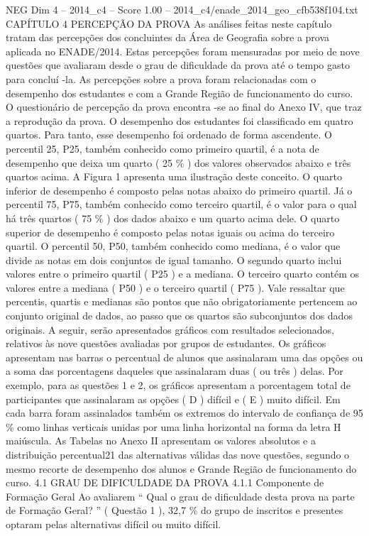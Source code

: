 \begin{textsample}{NEG Dim 4 – 2014\_c4 – Score 1.00 – 2014\_c4/enade\_2014\_geo\_cfb538f104.txt}  \label{ex:f4_neg_153}
CAPÍTULO 4 PERCEPÇÃO DA PROVA As análises feitas neste capítulo tratam das percepções dos concluintes da Área de Geografia sobre a prova aplicada no ENADE/2014.
Estas percepções foram mensuradas por meio de nove questões que avaliaram desde o grau de dificuldade da prova até o tempo gasto para concluí -la.
As percepções sobre a prova foram relacionadas com o desempenho dos estudantes e com a Grande Região de funcionamento do curso.
O questionário de percepção da prova encontra -se ao final do Anexo IV, que traz a reprodução da prova.
O desempenho dos estudantes foi classificado em quatro quartos.
Para tanto, esse desempenho foi ordenado de forma ascendente.
O percentil 25, P25, também conhecido como primeiro quartil, é a nota de desempenho que deixa um quarto ( 25 \% ) dos valores observados abaixo e três quartos acima.
A Figura 1 apresenta uma ilustração deste conceito.
O quarto inferior de desempenho é composto pelas notas abaixo do primeiro quartil.
Já o percentil 75, P75, também conhecido como terceiro quartil, é o valor para o qual há três quartos ( 75 \% ) dos dados abaixo e um quarto acima dele.
O quarto superior de desempenho é composto pelas notas iguais ou acima do terceiro quartil.
O percentil 50, P50, também conhecido como mediana, é o valor que divide as notas em dois conjuntos de igual tamanho.
O segundo quarto inclui valores entre o primeiro quartil ( P25 ) e a mediana.
O terceiro quarto contém os valores entre a mediana ( P50 ) e o terceiro quartil ( P75 ).
Vale ressaltar que percentis, quartis e medianas são pontos que não obrigatoriamente pertencem ao conjunto original de dados, ao passo que os quartos são subconjuntos dos dados originais.
A seguir, serão apresentados gráficos com resultados selecionados, relativos às nove questões avaliadas por grupos de estudantes.
Os gráficos apresentam nas barras o percentual de alunos que assinalaram uma das opções ou a soma das porcentagens daqueles que assinalaram duas ( ou três ) delas.
Por exemplo, para as questões 1 e 2, os gráficos apresentam a porcentagem total de participantes que assinalaram as opções ( D ) difícil e ( E ) muito difícil.
Em cada barra foram assinalados também os extremos do intervalo de confiança de 95 \% como linhas verticais unidas por uma linha horizontal na forma da letra H maiúscula.
As Tabelas no Anexo II apresentam os valores absolutos e a distribuição percentual21 das alternativas válidas das nove questões, segundo o mesmo recorte de desempenho dos alunos e Grande Região de funcionamento do curso. 4.1 GRAU DE DIFICULDADE DA PROVA 4.1.1 Componente de Formação Geral Ao avaliarem “ Qual o grau de dificuldade desta prova na parte de Formação Geral? ” ( Questão 1 ), 32,7 \% do grupo de inscritos e presentes optaram pelas alternativas difícil ou muito difícil.

\end{textsample}
